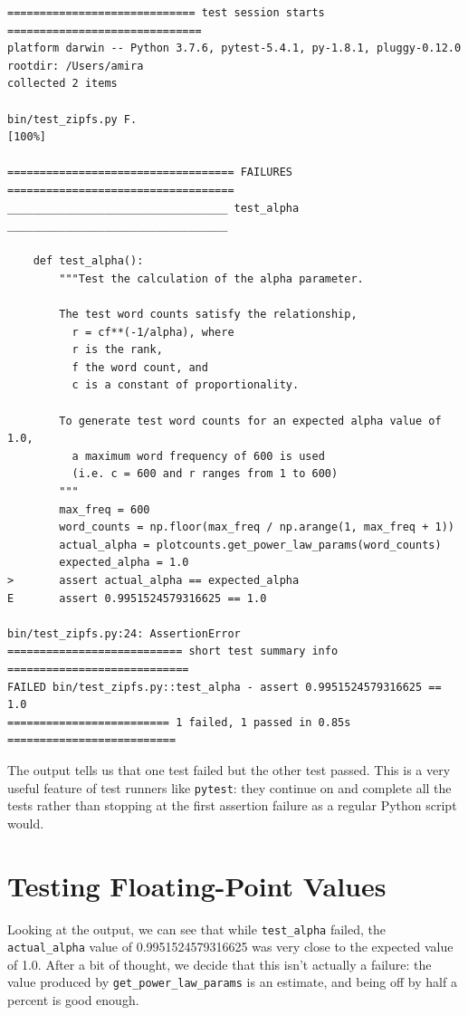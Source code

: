 \documentclass[
]{krantz}
\begin{document}
\begin{verbatim}
============================= test session starts ==============================
platform darwin -- Python 3.7.6, pytest-5.4.1, py-1.8.1, pluggy-0.12.0
rootdir: /Users/amira
collected 2 items                                                              

bin/test_zipfs.py F.                                                     [100%]

=================================== FAILURES ===================================
__________________________________ test_alpha __________________________________

    def test_alpha():
        """Test the calculation of the alpha parameter.
    
        The test word counts satisfy the relationship,
          r = cf**(-1/alpha), where
          r is the rank,
          f the word count, and
          c is a constant of proportionality.
    
        To generate test word counts for an expected alpha value of 1.0,
          a maximum word frequency of 600 is used
          (i.e. c = 600 and r ranges from 1 to 600)
        """
        max_freq = 600
        word_counts = np.floor(max_freq / np.arange(1, max_freq + 1))
        actual_alpha = plotcounts.get_power_law_params(word_counts)
        expected_alpha = 1.0
>       assert actual_alpha == expected_alpha
E       assert 0.9951524579316625 == 1.0

bin/test_zipfs.py:24: AssertionError
=========================== short test summary info ============================
FAILED bin/test_zipfs.py::test_alpha - assert 0.9951524579316625 == 1.0
========================= 1 failed, 1 passed in 0.85s ==========================
\end{verbatim}

The output tells us that one test failed but the other test passed.
This is a very useful feature of test runners like \texttt{pytest}:
they continue on and complete all the tests
rather than stopping at the first assertion failure as a regular Python script would.

\hypertarget{testing-numeric}{%
\section{Testing Floating-Point Values}\label{testing-numeric}}

Looking at the output,
we can see that while \texttt{test\_alpha} failed,
the \texttt{actual\_alpha} value of 0.9951524579316625 was very close to the expected value of 1.0.
After a bit of thought,
we decide that this isn't actually a failure:
the value produced by \texttt{get\_power\_law\_params} is an estimate,
and being off by half a percent is good enough.
\end{document}

